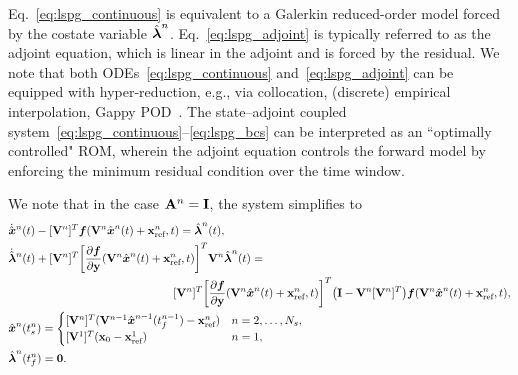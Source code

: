 Eq.~\eqref{eq:lspg_continuous} is equivalent to a Galerkin reduced-order
model forced by the costate variable $\hat{\boldsymbol \lambda}^{n}$.
Eq.~\eqref{eq:lspg_adjoint} is typically referred to as the adjoint
equation, which is linear in the adjoint and is forced by the residual.
We note that both ODEs~\eqref{eq:lspg_continuous}
and~\eqref{eq:lspg_adjoint} can be equipped with hyper-reduction, e.g., via
collocation, (discrete) empirical interpolation, Gappy
POD~\cite{everson_sirovich_gappy,eim,qdeim_drmac}. The state--adjoint
coupled system~\eqref{eq:lspg_continuous}--\eqref{eq:lspg_bcs} can be interpreted as an ``optimally controlled"
ROM, wherein the adjoint equation controls the forward model by enforcing the
minimum residual condition over the time window.

We note that in the case $\mathbf{A}^{n} =
\mathbf{I}$, the system simplifies to 
\begin{align*}\label{eq:lspg_continuous_simle} & \genstateDotArg{n}{t}  -
\basisspaceTArg{n}  \velocity(\veloargsromn) =  \adjointArg{n}{t} , \\
 &\adjointDotArg{n}{t}   + \basisspaceTArg{n} \bigg[\frac{\partial
\velocity}{\partial \stateyDiscrete}(\veloargsromn)\bigg]^T \basisspaceArg{n} \adjointArg{n}{t} = \\
&\hspace{2 in} \basisspaceTArg{n} \bigg[
\frac{\partial \velocity}{\partial \stateyDiscrete} (\veloargsromn) \bigg]^T \big( \mathbf{I} -   \basisspaceArg{n} \basisspaceTArg{n}
\big)    \velocity(\veloargsromn) , \\ & \genstateArg{n}{\timeStartArg{n}} =
\begin{cases} \basisspaceTArg{n}(\basisspaceArg{n-1}\genstateArg{n-1}{\timeEndArg{n-1}} - \stateInterceptArg{n})& n=2,\ldots,\nslabs, \\
\genstateICOne& n=1, \end{cases}\\
&\adjointArg{n}{\timeEndArg{n}} = \boldsymbol 0 .  \end{align*}

